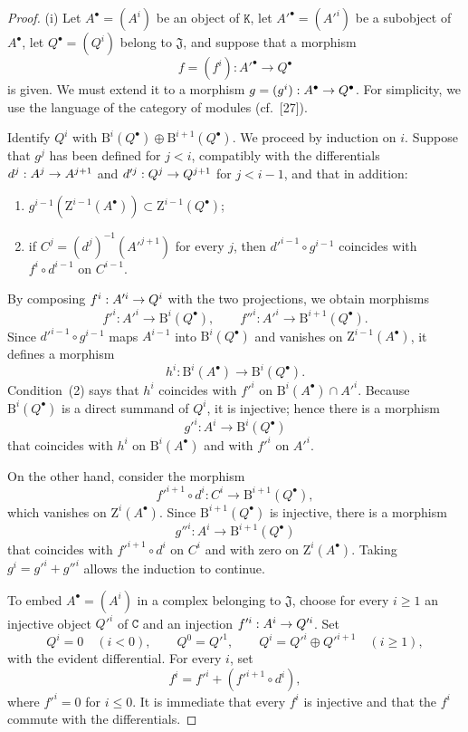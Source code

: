 \documentclass[oneside]{amsart}
\theoremstyle{ega-env-style}
\theoremstyle{ega-thm-env-style}
\theoremstyle{ega-defn-env-style}
\def\cat{\mathtt}                   %
\def\leq{\leqslant}                 %
\def\geq{\geqslant}                 %
\renewcommand{\to}{\mathchoice{\longrightarrow}{\rightarrow}{\rightarrow}{\rightarrow}}
\begin{document}
\begin{proof}
{\rm(i)}
Let $A^\bullet=(A^i)$ be an object of $\cat{K}$, let $A'^\bullet=(A'^i)$ be a subobject of $A^\bullet$, let $Q^\bullet=(Q^i)$ belong to $\mathfrak{J}$, and suppose that a morphism
\[
  f=(f^i):A'^\bullet\longrightarrow Q^\bullet
\]
is given.
We must extend it to a morphism $g=(g^i):A^\bullet\to Q^\bullet$.
For simplicity, we use the language of the category of modules (cf.~[27]).

Identify $Q^i$ with $\mathrm{B}^i(Q^\bullet)\oplus\mathrm{B}^{i+1}(Q^\bullet)$.
We proceed by induction on $i$.
Suppose that $g^j$ has been defined for $j<i$, compatibly with the differentials $d^j:A^j\to A^{j+1}$ and $d'^j:Q^j\to Q^{j+1}$ for $j<i-1$, and that in addition:
\begin{enumerate}
  \item[{\rm(1)}] $g^{i-1}(\mathrm{Z}^{i-1}(A^\bullet))\subset\mathrm{Z}^{i-1}(Q^\bullet)$;
  \item[{\rm(2)}] if $C^j=(d^j)^{-1}(A'^{j+1})$ for every $j$, then $d'^{i-1}\circ g^{i-1}$ coincides with $f^i\circ d^{i-1}$ on $C^{i-1}$.
\end{enumerate}
By composing $f^i:A'^i\to Q^i$ with the two projections, we obtain morphisms
\[
  f'^i:A'^i\longrightarrow\mathrm{B}^i(Q^\bullet),
  \qquad
  f''^i:A'^i\longrightarrow\mathrm{B}^{i+1}(Q^\bullet).
\]
Since $d'^{i-1}\circ g^{i-1}$ maps $A^{i-1}$ into $\mathrm{B}^i(Q^\bullet)$ and vanishes on $\mathrm{Z}^{i-1}(A^\bullet)$, it defines a morphism
\[
  h^i:\mathrm{B}^i(A^\bullet)\longrightarrow\mathrm{B}^i(Q^\bullet).
\]
Condition~{\rm(2)} says that $h^i$ coincides with $f'^i$ on $\mathrm{B}^i(A^\bullet)\cap A'^i$.
Because $\mathrm{B}^i(Q^\bullet)$ is a direct summand of $Q^i$, it is injective; hence there is a morphism
\[
  g'^i:A^i\longrightarrow\mathrm{B}^i(Q^\bullet)
\]
that coincides with $h^i$ on $\mathrm{B}^i(A^\bullet)$ and with $f'^i$ on $A'^i$.

On the other hand, consider the morphism
\[
  f'^{i+1}\circ d^i:C^i\longrightarrow\mathrm{B}^{i+1}(Q^\bullet),
\]
which vanishes on $\mathrm{Z}^i(A^\bullet)$.
Since $\mathrm{B}^{i+1}(Q^\bullet)$ is injective, there is a morphism
\[
  g''^i:A^i\longrightarrow\mathrm{B}^{i+1}(Q^\bullet)
\]
that coincides with $f'^{i+1}\circ d^i$ on $C^i$ and with zero on $\mathrm{Z}^i(A^\bullet)$.
Taking $g^i=g'^i+g''^i$ allows the induction to continue.

\smallskip
{}
To embed $A^\bullet=(A^i)$ in a complex belonging to $\mathfrak{J}$, choose for every $i\geq1$ an injective object $Q'^i$ of $\cat{C}$ and an injection $f'^i:A^i\to Q'^i$.
Set
\[
  Q^i=0\quad(i<0),\qquad Q^0=Q'^1,\qquad
  Q^i=Q'^i\oplus Q'^{i+1}\quad(i\geq1),
\]
with the evident differential.
For every $i$, set
\[
  f^i=f'^i+(f'^{i+1}\circ d^i),
\]
where $f'^i=0$ for $i\leq0$.
It is immediate that every $f^i$ is injective and that the $f^i$ commute with the differentials.
\end{proof}
\end{document}
